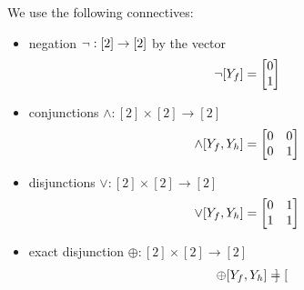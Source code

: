 


\begin{example}
    \label{exa:connectives}
    We use the following connectives:
    \begin{itemize}
        \item negation $\lnot: [2]\rightarrow [2]$ by the vector
        \begin{align*}
            \lnot[Y_{f}] = \begin{bmatrix}
                                          0 \\
                                          1
            \end{bmatrix}
        \end{align*}
        \item conjunctions $\land:  [2]\times[2] \rightarrow[2]$
        \begin{align*}
            \land[Y_{f},Y_{h}]
            = \begin{bmatrix}
                  0 & 0 \\
                  0 & 1
            \end{bmatrix}
        \end{align*}
        \item disjunctions $\lor : [2]\times[2] \rightarrow[2]$
        \begin{align*}
            \lor[Y_{f},Y_{h}]
            = \begin{bmatrix}
                  0 & 1 \\
                  1 & 1
            \end{bmatrix}
        \end{align*}
        \item exact disjunction $\oplus:  [2]\times[2] \rightarrow[2]$
        \begin{align*}
            \oplus[Y_{f},Y_{h}]
            = \begin{bmatrix}

\end{bmatrix}
\end{align*}
\end{itemize}
\end{example}

